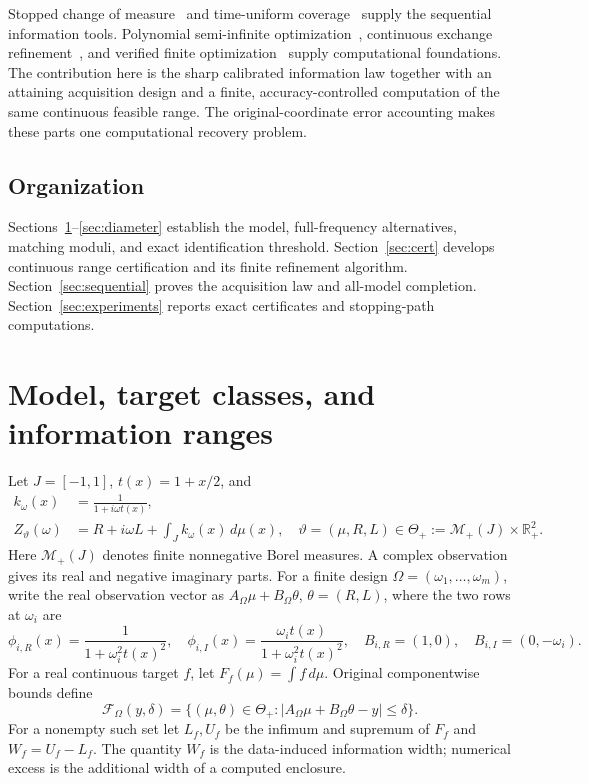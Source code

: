 \documentclass[10pt]{amsart}
\theoremstyle{definition}
\theoremstyle{remark}
\newcommand{\R}{\mathbb R}
\newcommand{\dd}{\,d}
\newcommand{\Mplus}{\mathcal M_+(J)}
\newcommand{\ThetaAll}{\Theta_+}
\newcommand{\F}{\mathcal F}
\begin{document}
Stopped change of measure~\cite{castro,kaufmann,garivier} and time-uniform coverage~\cite{howard} supply the sequential information tools. Polynomial semi-infinite optimization~\cite{papp}, continuous exchange refinement~\cite{grid}, and verified finite optimization~\cite{jansson,schmid} supply computational foundations. The contribution here is the sharp calibrated information law together with an attaining acquisition design and a finite, accuracy-controlled computation of the same continuous feasible range. The original-coordinate error accounting makes these parts one computational recovery problem.

\subsection{Organization}
Sections~\ref{sec:model}--\ref{sec:diameter} establish the model, full-frequency alternatives, matching moduli, and exact identification threshold. Section~\ref{sec:cert} develops continuous range certification and its finite refinement algorithm. Section~\ref{sec:sequential} proves the acquisition law and all-model completion. Section~\ref{sec:experiments} reports exact certificates and stopping-path computations.

\section{Model, target classes, and information ranges}\label{sec:model}
Let $J=[-1,1]$, $t(x)=1+x/2$, and
\begin{equation}\label{eq:model}
 \begin{aligned}
 k_\omega(x)&=\frac1{1+i\omega t(x)},\\
 Z_\vartheta(\omega)&=R+i\omega L+\int_J k_\omega(x)\dd\mu(x),
 \quad\vartheta=(\mu,R,L)\in\ThetaAll:=\Mplus\times\R_+^2.
 \end{aligned}
\end{equation}
Here $\Mplus$ denotes finite nonnegative Borel measures. A complex observation gives its real and negative imaginary parts. For a finite design $\Omega=(\omega_1,\ldots,\omega_m)$, write the real observation vector as $A_\Omega\mu+B_\Omega\theta$, $\theta=(R,L)$, where the two rows at $\omega_i$ are
\[
 \phi_{i,R}(x)=\frac1{1+\omega_i^2t(x)^2},\quad
 \phi_{i,I}(x)=\frac{\omega_it(x)}{1+\omega_i^2t(x)^2},\quad
 B_{i,R}=(1,0),\quad B_{i,I}=(0,-\omega_i).
\]
For a real continuous target $f$, let $F_f(\mu)=\int f\dd\mu$. Original componentwise bounds define
\begin{equation}\label{eq:raw}
 \F_\Omega(y,\delta)=
 \{(\mu,\theta)\in\ThetaAll:|A_\Omega\mu+B_\Omega\theta-y|\le\delta\}.
\end{equation}
For a nonempty such set let $L_f,U_f$ be the infimum and supremum of $F_f$ and $W_f=U_f-L_f$. The quantity $W_f$ is the data-induced information width; numerical excess is the additional width of a computed enclosure.
\end{document}
